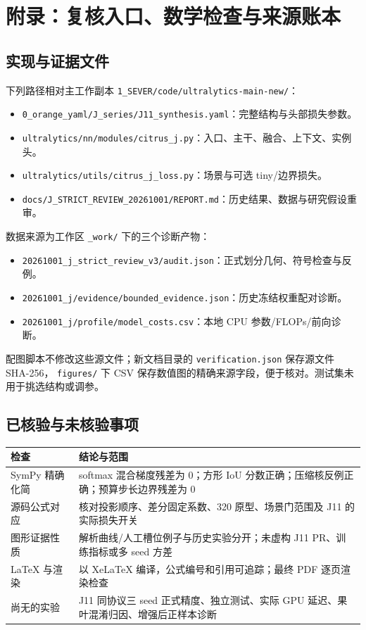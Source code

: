 \documentclass[UTF8,a4paper,11pt,fontset=windows]{ctexart}
\begin{document}
\section*{附录：复核入口、数学检查与来源账本}
\subsection*{实现与证据文件}
下列路径相对主工作副本 \texttt{1\_SEVER/code/ultralytics-main-new/}：
\begin{itemize}
\item \texttt{0\_orange\_yaml/J\_series/J11\_synthesis.yaml}：完整结构与头部损失参数。
\item \texttt{ultralytics/nn/modules/citrus\_j.py}：入口、主干、融合、上下文、实例头。
\item \texttt{ultralytics/utils/citrus\_j\_loss.py}：场景与可选 tiny/边界损失。
\item \texttt{docs/J\_STRICT\_REVIEW\_20261001/REPORT.md}：历史结果、数据与研究假设重审。
\end{itemize}
数据来源为工作区 \texttt{\_work/} 下的三个诊断产物：
\begin{itemize}
\item \texttt{20261001\_j\_strict\_review\_v3/audit.json}：正式划分几何、符号检查与反例。
\item \texttt{20261001\_j/evidence/bounded\_evidence.json}：历史冻结权重配对诊断。
\item \texttt{20261001\_j/profile/model\_costs.csv}：本地 CPU 参数/FLOPs/前向诊断。
\end{itemize}
配图脚本不修改这些源文件；新文档目录的 \texttt{verification.json} 保存源文件 SHA-256，
\texttt{figures/} 下 CSV 保存数值图的精确来源字段，便于核对。测试集未用于挑选结构或调参。

\subsection*{已核验与未核验事项}
\begin{table}[H]\centering\small
\begin{tabularx}{\linewidth}{p{36mm}Y}\toprule
检查 & 结论与范围\\\midrule
SymPy 精确化简 & softmax 混合梯度残差为 0；方形 IoU 分数正确；压缩核反例正确；预算步长边界残差为 0\\
源码公式对应 & 核对投影顺序、差分固定系数、320 原型、场景门范围及 J11 的实际损失开关\\
图形证据性质 & 解析曲线/人工槽位例子与历史实验分开；未虚构 J11 PR、训练指标或多 seed 方差\\
LaTeX 与渲染 & 以 XeLaTeX 编译，公式编号和引用可追踪；最终 PDF 逐页渲染检查\\
尚无的实验 & J11 同协议三 seed 正式精度、独立测试、实际 GPU 延迟、果叶混淆归因、增强后正样本诊断\\
\bottomrule\end{tabularx}
\end{table}
\end{document}
